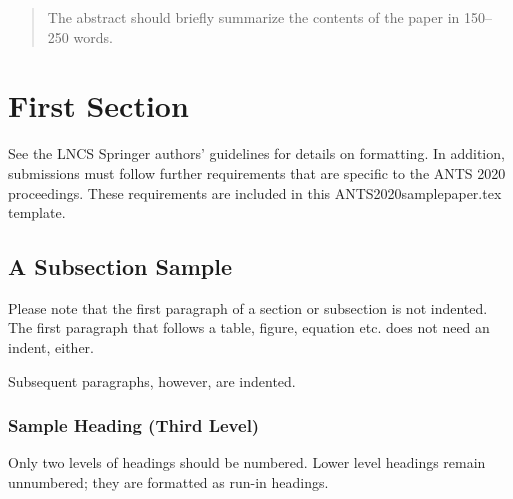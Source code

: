 \documentclass[runningheads]{llncs}
\begin{document}
	\maketitle              %
	\begin{abstract}
		The abstract should briefly summarize the contents of the paper in
		150--250 words.
		
	\end{abstract}
	\section{First Section}
	See the LNCS Springer authors’ guidelines for details on formatting. 
	In addition, submissions must follow further requirements that are
	specific to the ANTS 2020 proceedings. These requirements are included
	in this ANTS2020samplepaper.tex template.
	
	\subsection{A Subsection Sample}
	Please note that the first paragraph of a section or subsection is
	not indented. The first paragraph that follows a table, figure,
	equation etc. does not need an indent, either.
	
	Subsequent paragraphs, however, are indented.
	
	\subsubsection{Sample Heading (Third Level)}
	Only two levels of headings should be numbered. Lower level headings 
	remain unnumbered; they are formatted as run-in headings.
	
\end{document}
